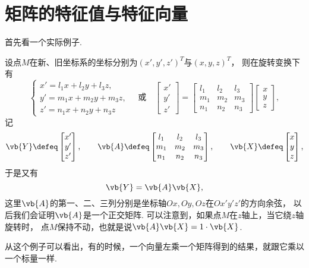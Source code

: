 \section{矩阵的特征值与特征向量}
首先看一个实际例子.
\begin{example}
设点\(M\)在新、旧坐标系的坐标分别为\((x',y',z')^T\)与\((x,y,z)^T\)，
则在旋转变换下有\[
	\left\{ \begin{array}{l}
		x' = l_1 x + l_2 y + l_3 z, \\
		y' = m_1 x + m_2 y + m_3 z, \\
		z' = n_1 x + n_2 y + n_3 z
	\end{array} \right.
	\quad\text{或}\quad
	\begin{bmatrix}
		x' \\ y' \\ z'
	\end{bmatrix}
	= \begin{bmatrix}
		l_1 & l_2 & l_3 \\
		m_1 & m_2 & m_3 \\
		n_1 & n_2 & n_3
	\end{bmatrix}
	\begin{bmatrix}
		x \\ y \\ z
	\end{bmatrix},
\]
记\[
	\vb{Y} \defeq \begin{bmatrix}
		x' \\ y' \\ z'
	\end{bmatrix},
	\qquad
	\vb{A} \defeq \begin{bmatrix}
		l_1 & l_2 & l_3 \\
		m_1 & m_2 & m_3 \\
		n_1 & n_2 & n_3
	\end{bmatrix},
	\qquad
	\vb{X} \defeq \begin{bmatrix}
		x \\ y \\ z
	\end{bmatrix},
\]
于是又有\[
	\vb{Y}=\vb{A}\vb{X},
\]
这里\(\vb{A}\)的第一、二、三列分别是坐标轴\(Ox,Oy,Oz\)在\(Ox'y'z'\)的方向余弦，
以后我们会证明\(\vb{A}\)是一个正交矩阵.
可以注意到，如果点\(M\)在\(z\)轴上，当它绕\(z\)轴旋转时，
点\(M\)保持不动，也就是说\(\vb{A}\vb{X}=1\cdot\vb{X}\).
\end{example}
从这个例子可以看出，有的时候，一个向量左乘一个矩阵得到的结果，就跟它乘以一个标量一样.

